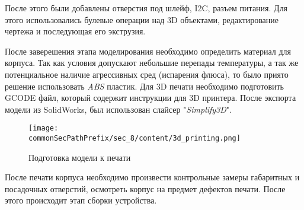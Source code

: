 После этого были добавлены отверстия под шлейф, I2C, разъем питания. Для этого использовались булевые операции над 3D объектами, редактирование чертежа и последующая его экструзия.

После заверешения этапа моделирования необходимо определить материал для корпуса. Так как условия допускают небольшие перепады температуры, а так же потенциальное наличие агрессивных сред (испарения флюса), то было приято решение использовать \textit{ABS} пластик. Для 3D печати необходимо подготовить GCODE файл, который содержит инструкции для 3D принтера. После экспорта модели из SolidWorks, был использован слайсер "\textit{Simplify3D}".
\begin{figure}[ht]
    \centering
    \texttt{[image: \\commonSecPathPrefix/sec\_8/content/3d\_printing.png]}
    \caption{Подготовка модели к печати}
\end{figure}

После печати корпуса необходимо произвести контрольные замеры габаритных и посадочных отверстий, осмотреть корпус на предмет дефектов печати. После этого происходит этап сборки устройства.
